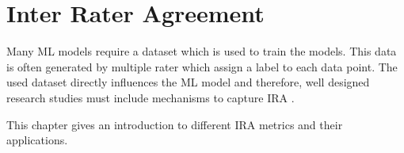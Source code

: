 \section{Inter Rater Agreement}
\label{chp:fundamentals:sec:inter_rater_agreement}
Many \ac{ML} models require a dataset which is used to train the models.
This data is often generated by multiple rater which assign a label to each data point.
The used dataset directly influences the \ac{ML} model \parencite{Gray:2011} and therefore, well designed research studies must include mechanisms to capture \ac{IRA} \parencite{McHugh:2012}.

This chapter gives an introduction to different \ac{IRA} metrics and their applications.





